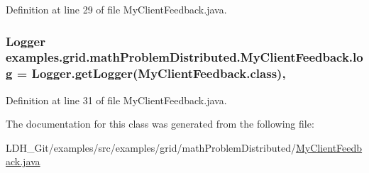 Definition at line 29 of file My\-Client\-Feedback.\-java.

\hypertarget{classexamples_1_1grid_1_1math_problem_distributed_1_1_my_client_feedback_a5712b4b5db4dc85a1629035df26f8163}{
\subsubsection[{log}]{\setlength{\rightskip}{0pt plus 5cm}Logger examples.\-grid.\-math\-Problem\-Distributed.\-My\-Client\-Feedback.\-log = Logger.\-get\-Logger(My\-Client\-Feedback.\-class)\hspace{0.3cm}{\ttfamily [static]}, {\ttfamily [private]}}}\label{classexamples_1_1grid_1_1math_problem_distributed_1_1_my_client_feedback_a5712b4b5db4dc85a1629035df26f8163}


Definition at line 31 of file My\-Client\-Feedback.\-java.



The documentation for this class was generated from the following file\-:\begin{DoxyCompactItemize}
\item 
L\-D\-H\-\_\-\-Git/examples/src/examples/grid/math\-Problem\-Distributed/\hyperlink{math_problem_distributed_2_my_client_feedback_8java}{My\-Client\-Feedback.\-java}\end{DoxyCompactItemize}
